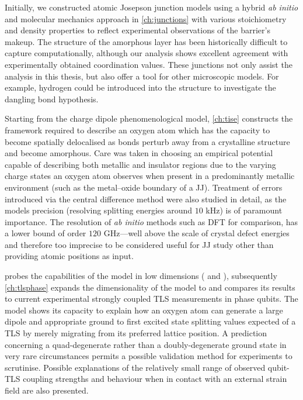 Initially, we constructed atomic Josepson junction models using a hybrid \textit{ab initio} and molecular mechanics approach in \cref{ch:junctions} with various stoichiometry and density properties to reflect experimental observations of the barrier's makeup.
The structure of the amorphous layer has been historically difficult to capture computationally, although our analysis shows excellent agreement with experimentally obtained coordination values.
These junctions not only assist the analysis in this thesis, but also offer a tool for other microscopic models.
For example, hydrogen could be introduced into the structure to investigate the dangling bond hypothesis.

Starting from the charge dipole phenomenological model, \cref{ch:tise} constructs the framework required to describe an oxygen atom which has the capacity to become spatially delocalised as bonds perturb away from a crystalline structure and become amorphous.
Care was taken in choosing an empirical potential capable of describing both metallic and insulator regions due to the varying charge states an oxygen atom observes when present in a predominantly metallic environment (such as the metal--oxide boundary of a JJ).
Treatment of errors introduced via the central difference method were also studied in detail, as the models precision (resolving splitting energies around $10$ kHz) is of paramount importance.
The resolution of \textit{ab initio} methods such as DFT for comparison, has a lower bound of order $120$ GHz---well above the scale of crystal defect energies and therefore too imprecise to be considered useful for JJ study other than providing atomic positions as input.

 probes the capabilities of the model in low dimensions ( and ), subsequently \cref{ch:tlsphase} expands the dimensionality of the model to  and compares its results to current experimental strongly coupled TLS measurements in phase qubits.
The model shows its capacity to explain how an oxygen atom can generate a large dipole and appropriate ground to first excited state splitting values expected of a TLS by merely migrating from its preferred lattice position.
A prediction concerning a quad-degenerate rather than a doubly-degenerate ground state in very rare circumstances permits a possible validation method for experiments to scrutinise.
Possible explanations of the relatively small range of observed qubit-TLS coupling strengths and behaviour when in contact with an external strain field are also presented.

